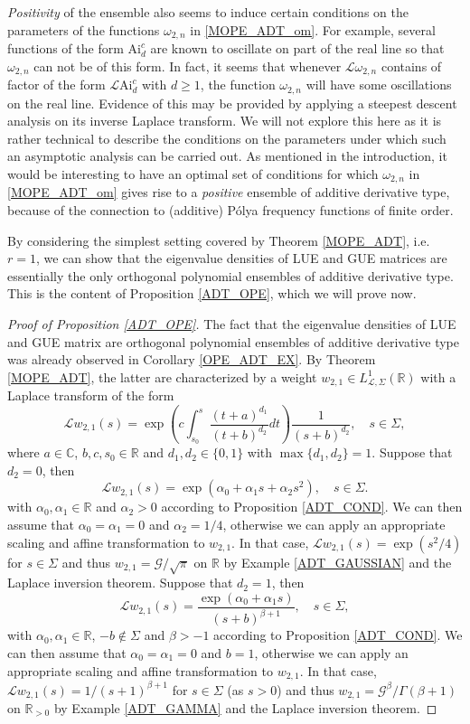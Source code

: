 \documentclass[a4paper,12pt,oneside]{article}
\theoremstyle{definition}
\newcommand{\C}{\mathbb{C}}
\newcommand{\R}{\mathbb{R}}
\newcommand{\om}{\omega}
\newcommand{\LT}[1]{\mathcal{L}#1}
\begin{document}
\textit{Positivity} of the ensemble also seems to induce certain conditions on the parameters of the functions $\om_{2,n}$ in \eqref{MOPE_ADT_om}. For example, several functions of the form $\text{Ai}_{d}^{c}$ are known to oscillate on part of the real line so that $\om_{2,n}$ can not be of this form. In fact, it seems that whenever $\LT{\om_{2,n}}$ contains of factor of the form $\LT{\text{Ai}_{d}^{c}}$ with $d\geq 1$, the function $\om_{2,n}$ will have some oscillations on the real line. Evidence of this may be provided by applying a steepest descent analysis on its inverse Laplace transform. We will not explore this here as it is rather technical to describe the conditions on the parameters under which such an asymptotic analysis can be carried out. As mentioned in the introduction, it would be interesting to have an optimal set of conditions for which $\om_{2,n}$ in \eqref{MOPE_ADT_om} gives rise to a \textit{positive} ensemble of additive derivative type, because of the connection to (additive) Pólya frequency functions of finite order.
\medbreak

By considering the simplest setting covered by Theorem \ref{MOPE_ADT}, i.e. $r=1$, we can show that the eigenvalue densities of LUE and GUE matrices are essentially the only orthogonal polynomial ensembles of additive derivative type. This is the content of Proposition \ref{ADT_OPE}, which we will prove now.

\begin{proof}[Proof of Proposition \ref{ADT_OPE}]
    The fact that the eigenvalue densities of LUE and GUE matrix are orthogonal polynomial ensembles of additive derivative type was already observed in Corollary \ref{OPE_ADT_EX}. By Theorem \ref{MOPE_ADT}, the latter are characterized by a weight $w_{2,1}\in L^{1}_{\LT{},\Sigma}(\R)$ with a Laplace transform of the form
        $$ \LT{w_{2,1}}(s) = \exp\left(c \int_{s_0}^s \frac{(t+a)^{d_1}}{(t+b)^{d_2}} dt \right) \frac{1}{(s+b)^{d_2}},\quad s\in\Sigma, $$
    where $a\in\C$, $b,c,s_0\in\R$ and $d_1,d_2\in\{0,1\}$ with $\max\{d_1,d_2\}=1$. Suppose that $d_2=0$, then
    $$ \LT{w_{2,1}}(s) = \exp\left(\alpha_0+\alpha_1 s + \alpha_2 s^2 \right),\quad s\in\Sigma. $$
    with $\alpha_0,\alpha_1\in\R$ and $\alpha_2>0$ according to Proposition \ref{ADT_COND}. We can then assume that $\alpha_0=\alpha_1=0$ and $\alpha_2=1/4$, otherwise we can apply an appropriate scaling and affine transformation to $w_{2,1}$. In that case, $\LT{w_{2,1}}(s) = \exp\left(s^2/4\right)$ for $s\in\Sigma$ and thus $w_{2,1}=\mathcal{G}/\sqrt{\pi}$ on $\R$ by Example \ref{ADT_GAUSSIAN} and the Laplace inversion theorem. Suppose that $d_2=1$, then
    $$ \LT{w_{2,1}}(s) = \frac{\exp\left(\alpha_0+\alpha_1 s\right)}{(s+b)^{\beta+1}},\quad s\in\Sigma, $$
    with $\alpha_0,\alpha_1\in\R$, $-b\not\in\Sigma$ and $\beta>-1$ according to Proposition \ref{ADT_COND}. We can then assume that $\alpha_0=\alpha_1=0$ and $b=1$, otherwise we can apply an appropriate scaling and affine transformation to $w_{2,1}$. In that case, $\LT{w_{2,1}}(s) = 1/(s+1)^{\beta+1}$ for $s\in\Sigma$ (as $s>0$) and thus $w_{2,1}=\mathcal{G}^{\beta}/\Gamma(\beta+1)$ on $\R_{>0}$ by Example \ref{ADT_GAMMA} and the Laplace inversion theorem.
\end{proof}
\end{document}
